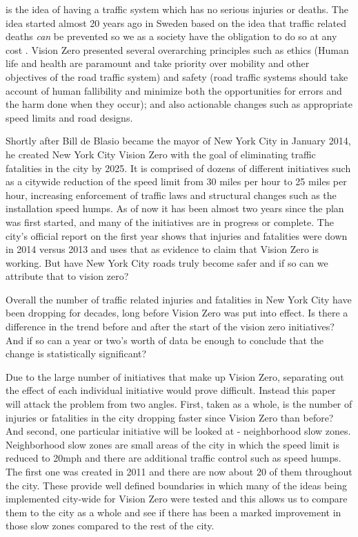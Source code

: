 \documentclass[10pt,journal,compsoc]{IEEEtran}
\begin{document}

 is the idea of having a traffic system which has no serious injuries or deaths.  The idea started almost 20 years ago in Sweden based on the idea that traffic related deaths \textit{can} be prevented so we as a society have the obligation to do so at any cost \cite{tingvall2000vision}.  Vision Zero presented several overarching principles such as ethics (Human life and health are paramount and take priority over mobility and other objectives of the road traffic system) and safety (road traffic systems should take account of human fallibility and minimize both the opportunities for errors and the harm done when they occur); and also actionable changes such as appropriate speed limits and road designs.

Shortly after Bill de Blasio became the mayor of New York City in January 2014, he created New York City Vision Zero with the goal of eliminating traffic fatalities in the city by 2025.  It is comprised of dozens of different initiatives such as a citywide reduction of the speed limit from 30 miles per hour to 25 miles per hour, increasing enforcement of traffic laws and structural changes such as the installation speed humps.  As of now it has been almost two years since the plan was first started, and many of the initiatives are in progress or complete.  The city's official report on the first year shows that injuries and fatalities were down in 2014 versus 2013 and uses that as evidence to claim that Vision Zero is working\cite{vzreport}.  But have New York City roads truly become safer and if so can we attribute that to vision zero?

Overall the number of traffic related injuries and fatalities in New York City have been dropping for decades, long before Vision Zero was put into effect.  Is there a difference in the trend before and after the start of the vision zero initiatives?  And if so can a year or two's worth of data be enough to conclude that the change is statistically significant?

Due to the large number of initiatives that make up Vision Zero, separating out the effect of each individual initiative would prove difficult.  Instead this paper will attack the problem from two angles.  First, taken as a whole, is the number of injuries or fatalities in the city dropping faster since Vision Zero than before?  And second, one particular initiative will be looked at - neighborhood slow zones.  Neighborhood slow zones are small areas of the city in which the speed limit is reduced to 20mph and there are additional traffic control such as speed humps.  The first one was created in 2011 and there are now about 20 of them throughout the city.  These provide well defined boundaries in which many of the ideas being implemented city-wide for Vision Zero were tested and this allows us to compare them to the city as a whole and see if there has been a marked improvement in those slow zones compared to the rest of the city.
\end{document}
